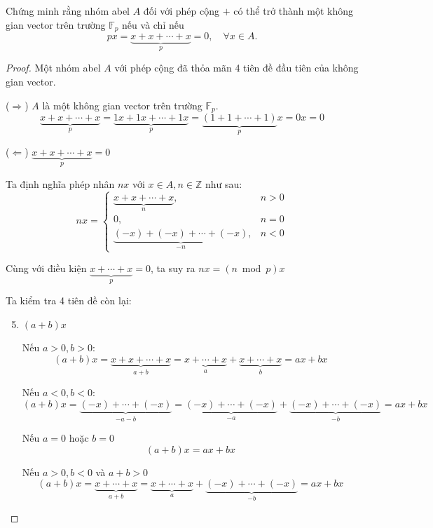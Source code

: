 \documentclass[class=linearalgebra,crop=false]{standalone}
\begin{document}
\begin{exercise}Chứng minh rằng nhóm abel $A$ đối với phép cộng $+$ có thể trở thành một không gian vector trên trường $\mathbb{F}_{p}$ nếu và chỉ nếu
    \[ px = \underbrace{x + x + \cdots + x}_{p} = 0,\quad \forall x\in A. \]
\end{exercise}

\begin{proof}Một nhóm abel $A$ với phép cộng đã thỏa mãn 4 tiên đề đầu tiên của không gian vector.
    \par($\Rightarrow$) $A$ là một không gian vector trên trường $\mathbb{F}_{p}$.
    \[ \underbrace{x + x + \cdots + x}_{p} = \underbrace{1x + 1x + \cdots + 1x}_{p} = \underbrace{(1 + 1 + \cdots + 1)}_{p}x = 0x = 0 \]
    \par($\Leftarrow$) $\underbrace{x + x + \cdots + x}_{p} = 0$
    \par Ta định nghĩa phép nhân $nx$ với $x\in A, n\in\mathbb{Z}$ như sau:
    \[
        nx =
        \begin{cases}
            \underbrace{x + x + \cdots + x}_{n},           & n > 0 \\
            0,                                             & n = 0 \\
            \underbrace{(-x) + (-x) + \cdots + (-x)}_{-n}, & n < 0
        \end{cases}
    \]
    \par Cùng với điều kiện $\underbrace{x + \cdots + x}_{p} = 0$, ta suy ra $nx = (n\bmod{p})x$
    \par Ta kiểm tra 4 tiên đề còn lại:
    \begin{enumerate}[label= (V\arabic*)]
        \setcounter{enumi}{4}
        \item $(a + b)x$
              \par Nếu $a > 0, b > 0$:
              \[ (a + b)x = \underbrace{x + x + \cdots + x}_{a+b} = \underbrace{x + \cdots + x}_{a} + \underbrace{x + \cdots + x}_{b} = ax + bx \]
              \par Nếu $a < 0, b < 0$:
              \[ (a + b)x = \underbrace{(-x) + \cdots + (-x)}_{-a-b} = \underbrace{(-x) + \cdots + (-x)}_{-a} + \underbrace{(-x) + \cdots + (-x)}_{-b} = ax + bx \]
              \par Nếu $a = 0$ hoặc $b = 0$
              \[ (a + b)x = ax + bx \]
              \par Nếu $a > 0, b < 0$ và $a + b > 0$
              \[ (a + b)x = \underbrace{x + \cdots + x}_{a+b} = \underbrace{x + \cdots + x}_{a} + \underbrace{(-x) + \cdots + (-x)}_{-b} = ax + bx \]

\end{enumerate}
\end{proof}
\end{document}
